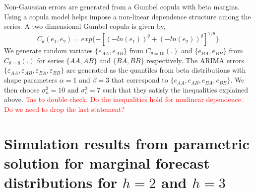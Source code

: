 \documentclass[12pt]{article}
\theoremstyle{definition}
\begin{document}
Non-Gaussian errors are generated from a Gumbel copula with beta margins. Using a copula model helps impose a non-linear dependence structure among the series. A two dimensional Gumbel copula is given by,
\begin{equation*}
C_\theta(e_1, e_2) = exp\{-[(-ln(e_1))^\theta + (-ln(e_2))^\theta]^{1/\theta}\}.
\end{equation*}
We generate random variates $\{e_{AA}, e_{AB}\}$ from $C_{\theta=10}(.)$ and $\{e_{BA}, e_{BB}\}$ from $C_{\theta=8}(.)$ for series $\{AA, AB\}$ and $\{BA, BB\}$ respectively. The ARIMA errors $\{\varepsilon_{AA}, \varepsilon_{AB}, \varepsilon_{BA}, \varepsilon_{BB}\}$ are generated as the quantiles from beta distributions with shape parameters $\alpha = 1$ and $\beta = 3$ that correspond to $\{e_{AA}, e_{AB}, e_{BA}, e_{BB}\}$.
We then choose $\sigma^2_u = 10$ and $\sigma^2_v = 7$ such that they satisfy the inequalities explained above. \textcolor{red}{Tas to double check. Do the inequalities hold for nonlinear dependence. Do we need to drop the last statement?}

\clearpage
\section{Simulation results from parametric solution for marginal forecast distributions for $h=2$ and $h=3$}\label{app:AnalysticalSolMargins}
\end{document}
